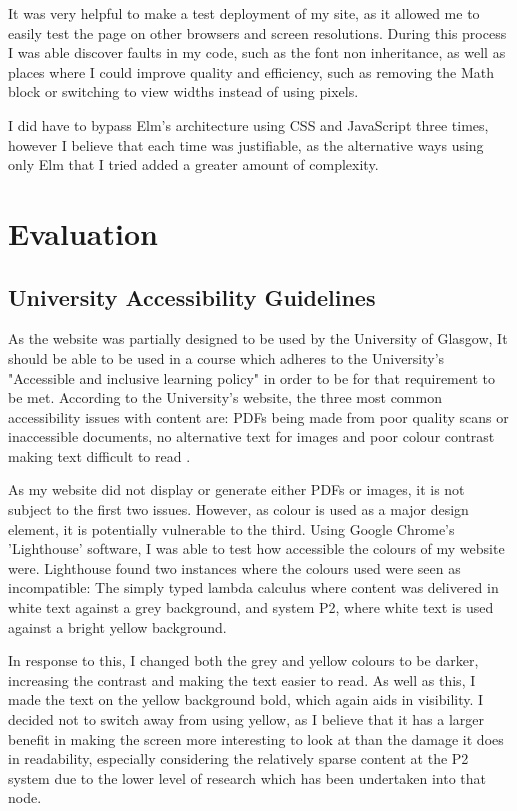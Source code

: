 \documentclass{l4proj}
\begin{document}
It was very helpful to make a test deployment of my site, as it allowed me to easily test the page on other browsers and screen resolutions.  During this process I was able discover faults in my code, such as the font non inheritance, as well as places where I could improve quality and efficiency, such as removing the Math block or switching to view widths instead of using pixels.

I did have to bypass Elm's architecture using CSS and JavaScript three times, however I believe that each time was justifiable, as the alternative ways using only Elm that I tried added a greater amount of complexity.
\chapter{Evaluation} 

\section{University Accessibility Guidelines}

As the website was partially designed to be used by the University of Glasgow, It should be able to be used in a course which adheres to the University's "Accessible and inclusive learning policy" in order to be for that requirement to be met. According to the University's website, the three most common accessibility issues with content are: PDFs being made from poor quality scans or inaccessible documents, no alternative text for images and poor colour contrast making text difficult to read \citep{accessible_inclusive}.

As my website did not display or generate either PDFs or images, it is not subject to the first two issues.  However, as colour is used as a major design element, it is potentially vulnerable to the third.  Using Google Chrome's 'Lighthouse' software, I was able to test how accessible the colours of my website were.  Lighthouse found two instances where the colours used were seen as incompatible: The simply typed lambda calculus where content was delivered in white text against a grey background, and system P2, where white text is used against a bright yellow background.

In response to this, I changed both the grey and yellow colours to be darker, increasing the contrast and making the text easier to read.  As well as this, I made the text on the yellow background bold, which again aids in visibility.  I decided not to switch away from using yellow, as I believe that it has a larger benefit in making the screen more interesting to look at than the damage it does in readability, especially considering the relatively sparse content at the P2 system due to the lower level of research which has been undertaken into that node.
\end{document}
